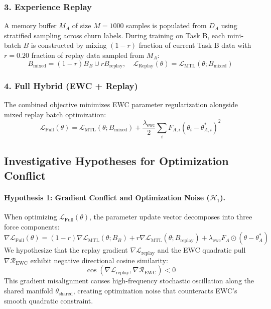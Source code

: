 \documentclass{article}
\begin{document}
\subsubsection{3. Experience Replay}
A memory buffer $M_A$ of size $M = 1000$ samples is populated from $D_A$ using stratified sampling across churn labels. During training on Task B, each mini-batch $B$ is constructed by mixing $(1-r)$ fraction of current Task B data with $r = 0.20$ fraction of replay data sampled from $M_A$:
\begin{equation}
B_{\text{mixed}} = (1-r) B_B \cup r B_{\text{replay}}, \quad \mathcal{L}_{\text{Replay}}(\theta) = \mathcal{L}_{\text{MTL}}(\theta; B_{\text{mixed}})
\end{equation}

\subsubsection{4. Full Hybrid (EWC + Replay)}
The combined objective minimizes EWC parameter regularization alongside mixed replay batch optimization:
\begin{equation}
\mathcal{L}_{\text{Full}}(\theta) = \mathcal{L}_{\text{MTL}}(\theta; B_{\text{mixed}}) + \frac{\lambda_{\text{ewc}}}{2} \sum_{i} F_{A,i} (\theta_i - \theta_{A,i}^*)^2
\end{equation}

\subsection{Investigative Hypotheses for Optimization Conflict}

\paragraph{Hypothesis 1: Gradient Conflict and Optimization Noise ($\mathcal{H}_1$).}
When optimizing $\mathcal{L}_{\text{Full}}(\theta)$, the parameter update vector decomposes into three force components:
\begin{equation}
\nabla \mathcal{L}_{\text{Full}}(\theta) = (1-r) \nabla \mathcal{L}_{\text{MTL}}(\theta; B_B) + r \nabla \mathcal{L}_{\text{MTL}}(\theta; B_{\text{replay}}) + \lambda_{\text{ewc}} F_A \odot (\theta - \theta_A^*)
\end{equation}
We hypothesize that the replay gradient $\nabla \mathcal{L}_{\text{replay}}$ and the EWC quadratic pull $\nabla \mathcal{R}_{\text{EWC}}$ exhibit negative directional cosine similarity:
\begin{equation}
\cos\left( \nabla \mathcal{L}_{\text{replay}}, \nabla \mathcal{R}_{\text{EWC}} \right) < 0
\end{equation}
This gradient misalignment causes high-frequency stochastic oscillation along the shared manifold $\theta_{\text{shared}}$, creating optimization noise that counteracts EWC's smooth quadratic constraint.
\end{document}
